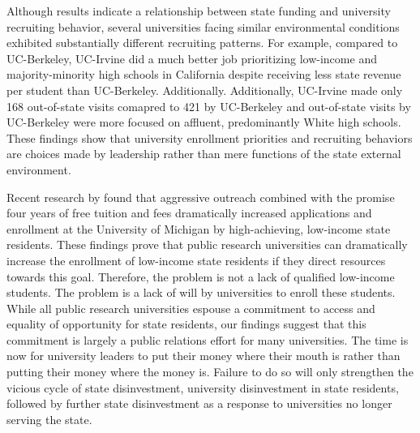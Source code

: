 \documentclass[twoside]{article}
\begin{document}
Although results indicate a relationship between state funding and university recruiting behavior, several universities facing similar environmental conditions exhibited substantially different recruiting patterns. For example, compared to UC-Berkeley, UC-Irvine did a much better job prioritizing low-income and majority-minority high schools in California despite receiving less state revenue per student than UC-Berkeley. Additionally.  Additionally, UC-Irvine made only 168 out-of-state visits comapred to 421 by UC-Berkeley and out-of-state visits by UC-Berkeley were more focused on affluent, predominantly White high schools.  These findings show that university enrollment priorities and recruiting behaviors are choices made by leadership rather than mere functions of the state external environment.

Recent research by \cite{RN4408} found that aggressive outreach combined with the promise four years of free tuition and fees dramatically increased applications and enrollment at the University of Michigan by high-achieving, low-income state residents.  These findings prove that public research universities can dramatically increase the enrollment of low-income state residents if they direct resources towards this goal. Therefore, the problem is not a lack of qualified low-income students. The problem is a lack of will by universities to enroll these students. While all public research universities espouse a commitment to access and equality of opportunity for state residents, our findings suggest that this commitment is largely a public relations effort for many universities. The time is now for university leaders to put their money where their mouth is rather than putting their money where the money is.  Failure to do so will only strengthen the vicious cycle of state disinvestment, university disinvestment in state residents, followed by further state disinvestment as a response to universities no longer serving the state.
\end{document}
